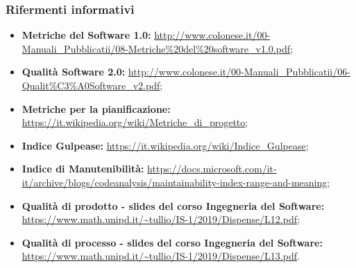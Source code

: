 \subsubsection{Rifermenti informativi}
\begin{itemize}
\item \textbf{Metriche del Software 1.0:} \url{http://www.colonese.it/00-Manuali_Pubblicatii/08-Metriche\%20del\%20software_v1.0.pdf};
\item \textbf{Qualità Software 2.0:} \url{http://www.colonese.it/00-Manuali_Pubblicatii/06-Qualit\%C3\%A0Software_v2.pdf};
\item \textbf{Metriche per la pianificazione:} \url{https://it.wikipedia.org/wiki/Metriche_di_progetto};
\item \textbf{Indice Gulpease:} \url{https://it.wikipedia.org/wiki/Indice_Gulpease};
\item \textbf{Indice di Manutenibilità:} \url{https://docs.microsoft.com/it-it/archive/blogs/codeanalysis/maintainability-index-range-and-meaning};
\item \textbf{Qualità di prodotto - slides del corso Ingegneria del Software:} \url{https://www.math.unipd.it/~tullio/IS-1/2019/Dispense/L12.pdf};
\item \textbf{Qualità di processo - slides del corso Ingegneria del Software:} \url{https://www.math.unipd.it/~tullio/IS-1/2019/Dispense/L13.pdf}.
\end{itemize}
